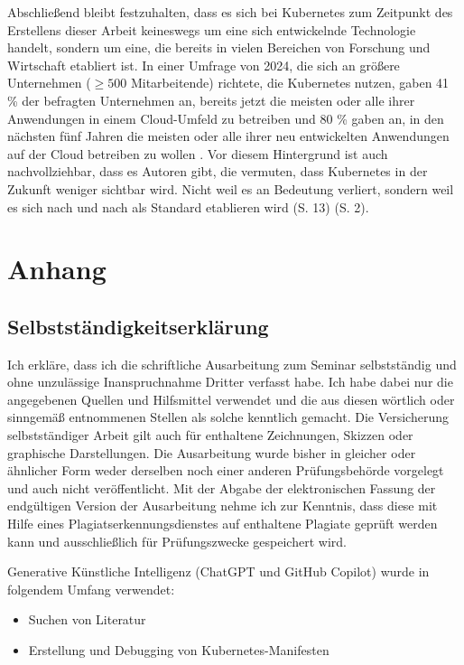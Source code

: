 \documentclass[11pt,a4paper]{article}
\begin{document}
Abschließend bleibt festzuhalten, dass es sich bei Kubernetes zum Zeitpunkt des Erstellens dieser
Arbeit keineswegs um eine sich entwickelnde Technologie handelt, sondern um eine, die bereits
in vielen Bereichen von Forschung und Wirtschaft etabliert ist. In einer Umfrage von 2024, die sich an
größere Unternehmen (\(\ge 500\) Mitarbeitende) richtete, die Kubernetes nutzen, gaben 41 \% der befragten Unternehmen an,
bereits jetzt die meisten oder alle ihrer Anwendungen in einem Cloud-Umfeld zu betreiben und
80 \% gaben an, in den nächsten fünf Jahren die meisten oder alle ihrer neu entwickelten Anwendungen
auf der Cloud betreiben zu wollen \cite{cncf}.
Vor diesem Hintergrund ist auch nachvollziehbar, dass es Autoren gibt, die vermuten,
dass Kubernetes in der Zukunft weniger sichtbar wird. Nicht weil es an Bedeutung verliert,
sondern weil es sich nach und nach als Standard etablieren wird \cite{domingus2022cloud} (S. 13) \cite{Schmeling_Dargatz_2022} (S. 2).

\newpage
\section{Anhang}
\subsection{Selbstständigkeitserklärung}

Ich erkläre, dass ich die schriftliche Ausarbeitung zum Seminar selbstständig
und ohne unzulässige Inanspruchnahme Dritter verfasst habe. Ich habe dabei nur
die angegebenen Quellen und Hilfsmittel verwendet und die aus diesen wörtlich
oder sinngemäß entnommenen Stellen als solche kenntlich gemacht. Die Versicherung
selbstständiger Arbeit gilt auch für enthaltene Zeichnungen, Skizzen oder
graphische Darstellungen. Die Ausarbeitung wurde bisher in gleicher oder ähnlicher
Form weder derselben noch einer anderen Prüfungsbehörde vorgelegt und auch nicht
veröffentlicht. Mit der Abgabe der elektronischen Fassung der endgültigen Version
der Ausarbeitung nehme ich zur Kenntnis, dass diese mit Hilfe eines
Plagiatserkennungsdienstes auf enthaltene Plagiate geprüft werden kann und
ausschließlich für Prüfungszwecke gespeichert wird.


Generative Künstliche Intelligenz (ChatGPT und GitHub Copilot) wurde in folgendem Umfang verwendet:
\begin{itemize}
  \item Suchen von Literatur
  \item Erstellung und Debugging von Kubernetes-Manifesten
\end{itemize}


\newpage
\printbibliography
\end{document}
